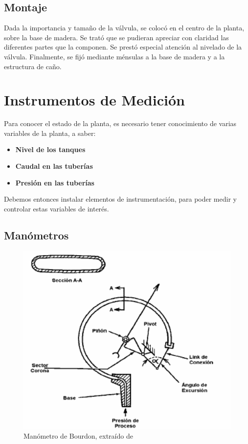 \subsection{Montaje}
Dada la importancia y tamaño de la válvula, se colocó en el centro de
la planta, sobre la base de madera. Se trató que se pudieran apreciar
con claridad las diferentes partes que la componen.
Se prestó especial atención al nivelado de la válvula.
Finalmente, se fijó mediante ménsulas a la base de madera y a la estructura
de caño.

\section{Instrumentos de Medición}
\label{sec:InstrumentosMedicion}
Para conocer el estado de la planta, es necesario tener conocimiento de varias
variables de la planta, a saber:
\begin{itemize}
 \item \textbf{Nivel de los tanques}
 \item \textbf{Caudal en las tuberías}
 \item \textbf{Presión en las tuberías}
\end{itemize}
Debemos entonces instalar elementos de instrumentación, para poder
medir y controlar estas variables de interés.

\subsection{Manómetros}
\label{subsec:Manometros}

\begin{figure}[t]
 \centering
\includegraphics[width=.6\textwidth]
{Cap2-DisenoEnsamblado/images/manomBourdon.png}
 \caption{Manómetro de Bourdon, extraído de \cite{bib:ApuntesPuglesiPlacaOrif}}
 \label{fig:manometroBourdon}
\end{figure}

